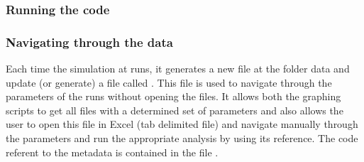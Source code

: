 \documentclass[12pt]{article}
\begin{document}
\subsubsection{Running the code}



\subsubsection{Navigating through the data}

Each time the simulation at  runs, it generates a new file at the folder data and update (or generate) a file called . This file is used to navigate through the parameters of the runs without opening the files. It allows both the graphing scripts to get all files with a determined set of parameters and also allows the user to open this file in Excel (tab delimited file) and navigate manually through the parameters and run the appropriate analysis by using its  reference. The code referent to the metadata is contained in the file .




\end{document}
